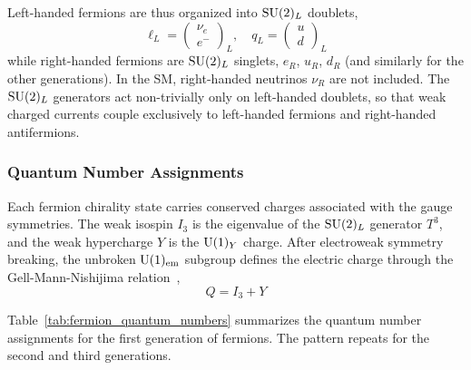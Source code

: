 Left-handed fermions are thus organized into $\mathrm{SU}(2)_L$ doublets,
\begin{equation}
\ell_L = \begin{pmatrix} \nu_e \\ e^- \end{pmatrix}_L, \quad
q_L = \begin{pmatrix} u \\ d \end{pmatrix}_L
\end{equation}
while right-handed fermions are $\mathrm{SU}(2)_L$ singlets, $e_R$, $u_R$, $d_R$ (and similarly for the other generations). In the SM, right-handed neutrinos $\nu_R$ are not included. The $\mathrm{SU}(2)_L$ generators act non-trivially only on left-handed doublets, so that weak charged currents couple exclusively to left-handed fermions and right-handed antifermions.

\subsubsection{Quantum Number Assignments}

Each fermion chirality state carries conserved charges associated with the gauge symmetries. The weak isospin $I_3$ is the eigenvalue of the $\mathrm{SU}(2)_L$ generator $T^3$, and the weak hypercharge $Y$ is the $\mathrm{U}(1)_Y$ charge. After electroweak symmetry breaking, the unbroken $\mathrm{U}(1)_{\text{em}}$ subgroup defines the electric charge through the Gell-Mann-Nishijima relation~\cite{Nakano:1953zz,GellMann:1956iw},
\begin{equation}
Q = I_3 + Y
\label{eq:gellmann_nishijima}
\end{equation}

Table~\ref{tab:fermion_quantum_numbers} summarizes the quantum number assignments for the first generation of fermions. The pattern repeats for the second and third generations.


